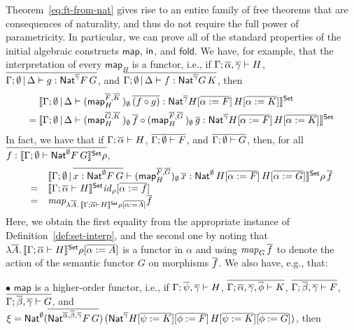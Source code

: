 \documentclass{lmcs}
\theoremstyle{plain}\newtheorem{satz}[thm]{Satz}
\newcommand{\fold}{\mathsf{fold}}
\renewcommand{\id}{\mathit{id}}
\newcommand{\map}{\mathsf{map}}
\begin{document}
Theorem~\ref{eq:ft-from-nat} gives rise to an entire family of free
theorems that are consequences of naturality, and thus do not require
the full power of parametricity. In particular, we can prove all of
the standard properties of the initial algebraic constructs $\map$,
$\mathsf{in}$, and $\fold$. We have, for example, that the interpretation of
every $\map_H$ is a functor, i.e., if $\Gamma; \overline{\alpha}, \overline{\gamma}
\vdash H$, $\overline{\Gamma; \emptyset \,|\, \Delta \vdash g :
  \mathsf{Nat}^{\overline{\gamma}} F \, G}$, and $\overline{\Gamma; \emptyset \,|\, \Delta
  \vdash f : \mathsf{Nat}^{\overline{\gamma}} G \, K}$, then
  \begin{align*}
&\setsem{
\Gamma; \emptyset \,|\, \Delta \vdash 
  (\map^{\ol{F}, \ol{K}}_H \,)_{\emptyset} \, \ol{(f \circ g)}
  : \Nat^{\ol\gamma} H[\ol{\alpha := F}] \, H[\ol{\alpha := K}]} \\ 
= \hspace{0.03in} 
  &\setsem{
  \Gamma; \emptyset \,|\, \Delta \vdash 
  (\map^{\ol{G}, \ol{K}}_H \,)_{\emptyset} \, \ol{f} \circ 
  (\map^{\ol{F}, \ol{G}}_H \,)_{\emptyset} \, \ol{g}
  : \Nat^{\ol\gamma} H[\ol{\alpha := F}] \, H[\ol{\alpha := K}]}
\end{align*}
In fact, we have that if $\Gamma; \overline{\alpha} \vdash H$, $\overline{\Gamma;
  \emptyset \vdash F}$, and $\overline{\Gamma; \emptyset \vdash G}$, then,
for all $\overline{f : \llbracket{\Gamma;\emptyset \vdash \mathsf{Nat}^\emptyset
    F\,G}\rrbracket^{\mathsf{Set}}\rho}$,
\[\begin{array}{rl}
&\setsem{ \Gamma;\emptyset\,|\,\ol{x : \Nat^\emptyset F \, G}
  \vdash (\map^{\ol{F},\ol{G}}_H)_\emptyset\,\ol x :
  \Nat^{\emptyset}\,H[\ol{\alpha := F}]\,H[\ol{\alpha := G}]}
\rho\,\ol f\\ =& \setsem{\Gamma; \ol{\alpha}\vdash H}
\id_{\rho}[\ol{\alpha := f}] \\ =&
\mathit{map}_{\lambda \ol{A}.\,\setsem{\Gamma; \ol{\alpha}\vdash H} \rho [\ol{\alpha := A}]} \ol{f} \\
\end{array}\]
Here, we obtain the first equality from the appropriate instance of
Definition~\ref{def:set-interp}, and the second one by noting that
$\lambda \overline{A}.\,\llbracket{\Gamma; \overline{\alpha}\vdash H}\rrbracket^{\mathsf{Set}} \rho
[\overline{\alpha := A}]$ is a functor in $\alpha$ and using
$\mathit{map}_G\,\overline{f}$ to denote the action of the semantic functor
$G$ on morphisms $\overline{f}$. We also have, e.g., that:

\vspace*{0.1in}

\noindent
$\bullet$\; $\map$ is a higher-order functor, i.e., if $\Gamma;
\overline{\psi}, \overline{\gamma} \vdash H$,\; $\overline{\Gamma; \overline{\alpha},
  \overline{\gamma}, \overline{\phi} \vdash K}$,\; $\overline{\Gamma; \overline{\beta},
  \overline{\gamma} \vdash F}$,\; $\overline{\Gamma; \overline{\beta}, \overline{\gamma}
  \vdash G}$, and $\xi = \mathsf{Nat}^{\emptyset} (\overline{\mathsf{Nat}^{\overline{\alpha},
    \overline{\beta}, \overline{\gamma}} F\, G})\, (\mathsf{Nat}^{\overline{\gamma}} H[\overline{\psi
    := K}][\overline{\phi := F}]\, H[\overline{\psi := K}][\overline{\phi := G}])$, then
\end{document}
